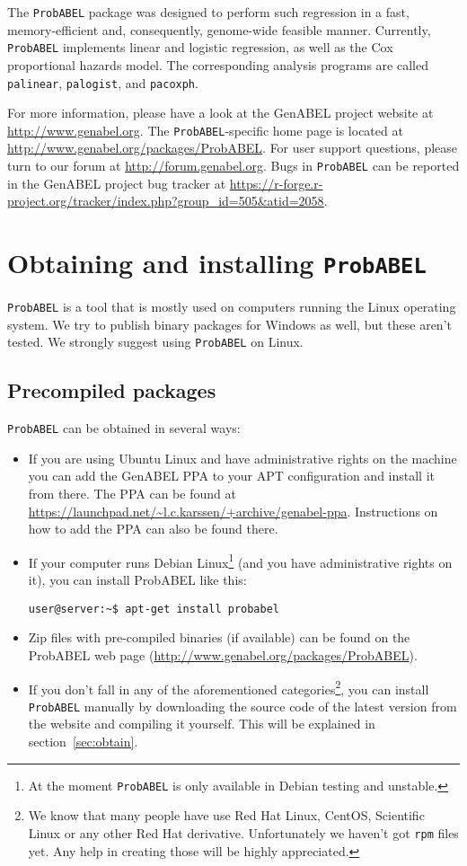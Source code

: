 \documentclass[12pt,a4paper]{article}
\newcommand{\PA}{\texttt{ProbABEL}}
\begin{document}
The \PA{} package was designed to perform such regression
in a fast, memory-efficient and, consequently, genome-wide feasible manner.
Currently, \PA{} implements linear and logistic regression,
as well as the Cox proportional hazards model. The corresponding analysis
programs are called \texttt{palinear},  \texttt{palogist},
and \texttt{pacoxph}.

For more information, please have a look at the GenABEL project
website at \url{http://www.genabel.org}. The \PA{}-specific home
page is located at
\url{http://www.genabel.org/packages/ProbABEL}. For user support
questions, please turn to our forum at
\url{http://forum.genabel.org}. Bugs in \PA{} can be reported in the
GenABEL project bug tracker at
\url{https://r-forge.r-project.org/tracker/index.php?group_id=505&atid=2058}.

\section{Obtaining and installing \PA}
\label{sec:obtaininstall}
\PA{} is a tool that is mostly used on computers running the Linux
operating system. We try to publish binary packages for Windows as
well, but these aren't tested. We strongly suggest using \PA{} on
Linux.

\subsection{Precompiled packages}
\PA{} can be obtained in several ways:
\begin{itemize}
\item If you are using Ubuntu Linux and have administrative rights on
  the machine you can add the GenABEL PPA to your APT configuration
  and install it from there. The PPA can be found at
  \url{https://launchpad.net/~l.c.karssen/+archive/genabel-ppa}. Instructions
  on how to add the PPA can also be found there.
\item If your computer runs Debian Linux\footnote{At the moment \PA{}
    is only available in Debian testing and unstable.} (and you have
  administrative rights on it), you can install ProbABEL like this:
  \begin{lstlisting}
user@server:~$ apt-get install probabel
  \end{lstlisting}
\item Zip files with pre-compiled binaries (if available) can be found
  on the ProbABEL web page
  (\url{http://www.genabel.org/packages/ProbABEL}).
\item If you don't fall in any of the aforementioned
  categories\footnote{We know that many people have use Red Hat Linux,
    CentOS, Scientific Linux or any other Red Hat
    derivative. Unfortunately we haven't got \texttt{rpm} files
    yet. Any help in creating those will be highly appreciated.}, you
  can install \PA{} manually by downloading the source code of the
  latest version from the website and compiling it yourself. This will
  be explained in section~\ref{sec:obtain}.
\end{itemize}
\end{document}
